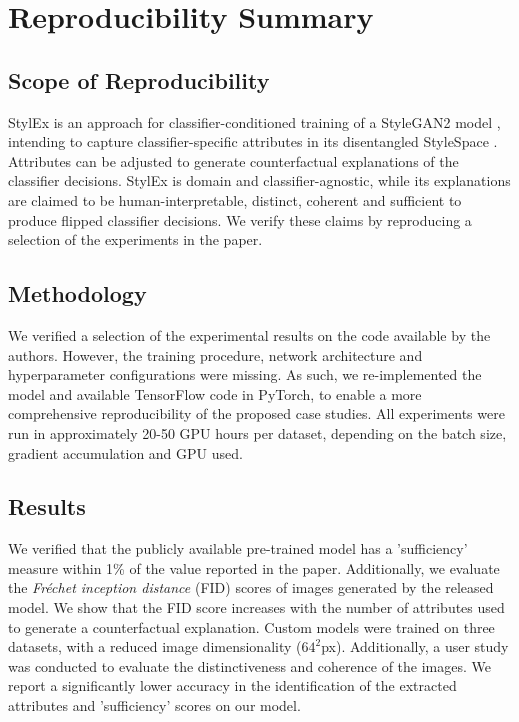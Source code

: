 \section{Reproducibility Summary}

\subsection*{Scope of Reproducibility}

StylEx is an approach for classifier-conditioned training of a StyleGAN2 model \cite{karras2020analyzing}, intending to capture classifier-specific attributes in its disentangled StyleSpace \cite{9577297}. Attributes can be adjusted to generate counterfactual explanations of the classifier decisions. StylEx is domain and classifier-agnostic, while its explanations are claimed to be human-interpretable, distinct, coherent and sufficient to produce flipped classifier decisions. We verify these claims by reproducing a selection of the experiments in the paper.


\subsection*{Methodology}

We verified a selection of the experimental results on the code available by the authors. However, the training procedure, network architecture and hyperparameter configurations were missing. As such, we re-implemented the model and available TensorFlow code in PyTorch, to enable a more comprehensive reproducibility of the proposed case studies. All experiments were run in approximately 20-50 GPU hours per dataset, depending on the batch size, gradient accumulation and GPU used.


\subsection*{Results}

We verified that the publicly available pre-trained model has a 'sufficiency' measure within 1\% of the value reported in the paper. Additionally, we evaluate the \textit{Fréchet inception distance} (FID) scores of images generated by the released model. We show that the FID score increases with the number of attributes used to generate a counterfactual explanation. Custom models were trained on three datasets, with a reduced image dimensionality ($64^2$px). Additionally, a user study was conducted to evaluate the distinctiveness and coherence of the images. We report a significantly lower accuracy in the identification of the extracted attributes and 'sufficiency' scores on our model.


